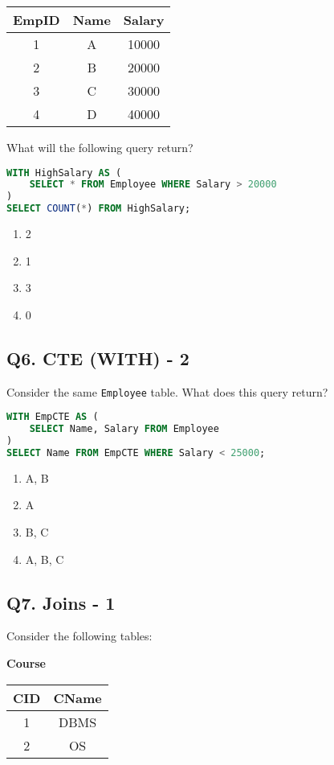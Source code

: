 \begin{tabular}{|c|c|c|}
\hline
\textbf{EmpID} & \textbf{Name} & \textbf{Salary} \\
\hline
1 & A & 10000 \\
2 & B & 20000 \\
3 & C & 30000 \\
4 & D & 40000 \\
\hline
\end{tabular}

What will the following query return?

\begin{lstlisting}[language=SQL]
WITH HighSalary AS (
    SELECT * FROM Employee WHERE Salary > 20000
)
SELECT COUNT(*) FROM HighSalary;
\end{lstlisting}

\begin{enumerate}[label=(\alph*)]
    \item 2
    \item 1
    \item 3
    \item 0
\end{enumerate}

\subsection*{Q6. CTE (WITH) - 2}
Consider the same \texttt{Employee} table. What does this query return?

\begin{lstlisting}[language=SQL]
WITH EmpCTE AS (
    SELECT Name, Salary FROM Employee
)
SELECT Name FROM EmpCTE WHERE Salary < 25000;
\end{lstlisting}

\begin{enumerate}[label=(\alph*)]
    \item A, B
    \item A
    \item B, C
    \item A, B, C
\end{enumerate}

\subsection*{Q7. Joins - 1}
Consider the following tables:

\textbf{Course}

\begin{tabular}{|c|c|}
\hline
\textbf{CID} & \textbf{CName} \\
\hline
1 & DBMS \\
2 & OS \\
\hline
\end{tabular}

